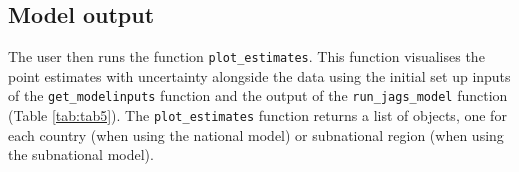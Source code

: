\subsection{Model output}\label{model-output}

The user then runs the function \texttt{plot\_estimates}. This function visualises the point estimates with uncertainty alongside the data using the initial set up inputs of the \texttt{get\_modelinputs} function and the output of the \texttt{run\_jags\_model} function (Table \ref{tab:tab5}). The \texttt{plot\_estimates} function returns a list of  objects, one for each country (when using the national model) or subnational region (when using the subnational model).

\begin{table}[]
\caption{The arguments of the plot\_estimates function. The purpose of this function is to plot the data alongside the model estimates so that users can visualise their estimated method supply shares. The argument name and data type of the argument is stated, a description of the argument is then provided. }
\label{tab:tab5}
\end{table}

